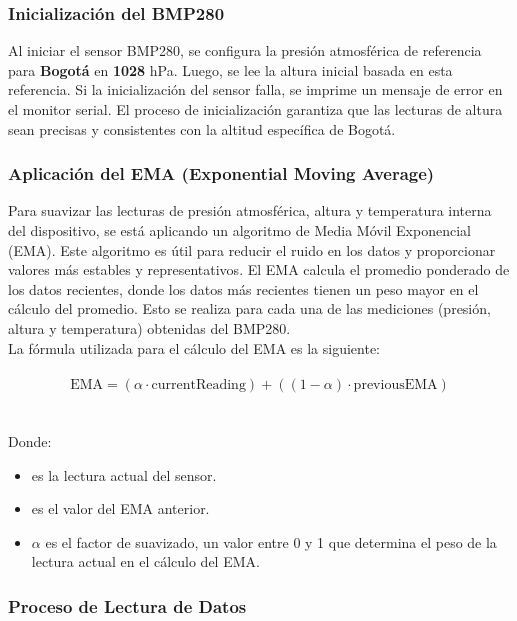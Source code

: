     \subsubsection{Inicialización del BMP280}

        Al iniciar el sensor BMP280, se configura la presión atmosférica de referencia para \textbf{Bogotá} en \textbf{1028} hPa. Luego, se lee la altura inicial basada en esta referencia. Si la inicialización del sensor falla, se imprime un mensaje de error en el monitor serial. El proceso de inicialización garantiza que las lecturas de altura sean precisas y consistentes con la altitud específica de Bogotá.

    \subsubsection{Aplicación del EMA (Exponential Moving Average)}

    Para suavizar las lecturas de presión atmosférica, altura y temperatura interna del dispositivo, se está aplicando un algoritmo de Media Móvil Exponencial (EMA). Este algoritmo es útil para reducir el ruido en los datos y proporcionar valores más estables y representativos. El EMA calcula el promedio ponderado de los datos recientes, donde los datos más recientes tienen un peso mayor en el cálculo del promedio. Esto se realiza para cada una de las mediciones (presión, altura y temperatura) obtenidas del BMP280. \\

    La fórmula utilizada para el cálculo del EMA es la siguiente:
    \\ \\
    \[
    \text{EMA} = (\alpha \cdot \text{currentReading}) + ((1 - \alpha) \cdot \text{previousEMA})
    \]
    \\ \\
    Donde:
    \begin{itemize}
        \item {} es la lectura actual del sensor.
        \item {} es el valor del EMA anterior.
        \item $\alpha$ es el factor de suavizado, un valor entre 0 y 1 que determina el peso de la lectura actual en el cálculo del EMA.
    \end{itemize}

    \subsubsection{Proceso de Lectura de Datos}

